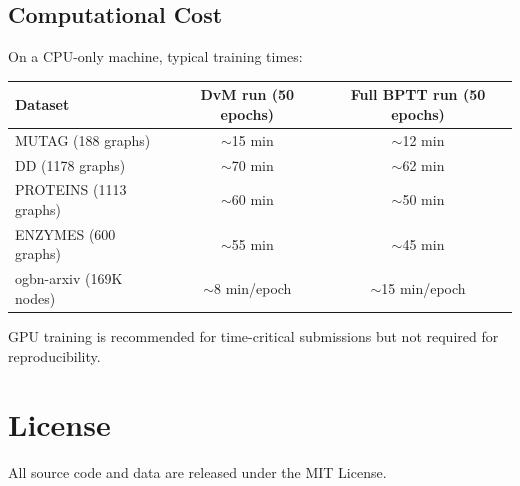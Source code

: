 \documentclass[a4paper,11pt]{article}
\begin{document}
\subsection{Computational Cost}

On a CPU-only machine, typical training times:
\begin{center}
\begin{tabular}{lcc}
\toprule
\textbf{Dataset} & \textbf{DvM run (50 epochs)} & \textbf{Full BPTT run (50 epochs)} \\
\midrule
MUTAG (188 graphs) & $\sim$15 min & $\sim$12 min \\
DD (1178 graphs) & $\sim$70 min & $\sim$62 min \\
PROTEINS (1113 graphs) & $\sim$60 min & $\sim$50 min \\
ENZYMES (600 graphs) & $\sim$55 min & $\sim$45 min \\
ogbn-arxiv (169K nodes) & $\sim$8 min/epoch & $\sim$15 min/epoch \\
\bottomrule
\end{tabular}
\end{center}

GPU training is recommended for time-critical submissions but not required for reproducibility.

\section*{License}

All source code and data are released under the MIT License.
\end{document}
